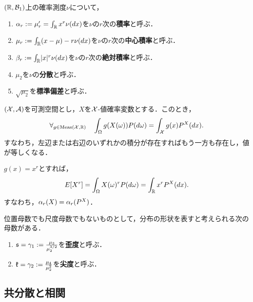 \documentclass[uplatex,dvipdfmx]{jsreport}
\begin{document}
\begin{definition}
    $(\mathbb{R},\mathcal{B}_1)$上の確率測度$\nu$について，
    \begin{enumerate}
        \item $\alpha_r:=\mu'_r=\int_{\mathbb{R}} x^r\nu(dx)$を$\nu$の$r$次の\textbf{積率}と呼ぶ．
        \item $\mu_r:=\int_{\mathbb{R}}(x-\mu)-r\nu(dx)$を$\nu$の$r$次の\textbf{中心積率}と呼ぶ．
        \item $\beta_r:=\int_{\mathbb{R}}\lvert x\rvert^r\nu(dx)$を$\nu$の$r$次の\textbf{絶対積率}と呼ぶ．
        \item $\mu_2$を$\nu$の\textbf{分散}と呼ぶ．
        \item $\sqrt{\mu_2}$を\textbf{標準偏差}と呼ぶ．
    \end{enumerate}
\end{definition}

\begin{proposition}
    $(\mathcal{X},\mathcal{A})$を可測空間とし，$X$を$\mathcal{X}$-値確率変数とする．このとき，
    \[\forall_{g\in\mathrm{Meas}(\mathcal{X},\mathbb{R})}\quad\int_\Omega g(X(\omega))P(d\omega)=\int_{\mathcal{X}} g(x)P^X(dx).\]
    すなわち，左辺または右辺のいずれかの積分が存在すればもう一方も存在し，値が等しくなる．
\end{proposition}

\begin{corollary}
    $g(x)=x^r$とすれば，
    \[E[X^r]=\int_\Omega X(\omega)^rP(d\omega)=\int_{\mathbb{R}} x^r P^X(dx).\]
    すなわち，$\alpha_r(X)=\alpha_r(P^X)$．
\end{corollary}

\begin{definition}
    位置母数でも尺度母数でもないものとして，分布の形状を表すと考えられる次の母数がある．
    \begin{enumerate}
        \item $\mathfrak{s}=\gamma_1:=\frac{\mu_3}{\mu_2^{3/2}}$を\textbf{歪度}と呼ぶ．
        \item $\mathfrak{k}=\gamma_2:=\frac{\mu_4}{\mu_2^2}$を\textbf{尖度}と呼ぶ．
    \end{enumerate}
\end{definition}

\subsection{共分散と相関}
\end{document}
